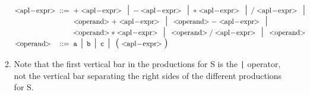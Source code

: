 \documentclass[11pt]{article}
\begin{document}
\begin{enumerate}
\begin{enumerate}
                  \(
                    \renewcommand{\arraystretch}{1.25}
                    \begin{array}[t]{@{}l@{\hspace{2mm}}l@{\hspace{2mm}}l}
                      \aplexpr
                        & ::=
                        & + \aplexpr \midspc - \aplexpr \midspc
                          * \aplexpr \midspc / \aplexpr \midspc
                          \\
                        & %
                        & \aploperand + \aplexpr \midspc
                          \aploperand - \aplexpr \midspc
                          \\
                        & %
                        & %
                          \aploperand * \aplexpr \midspc
                          \aploperand / \aplexpr \midspc \aploperand
                          \\
                      \aploperand
                        & ::=
                        & \mathtt{a} \midspc \mathtt{b} \midspc
                          \mathtt{c} \midspc \: \lpar \aplexpr \rpar
                          \\
                    \end{array}
                  \)

            \item Note that the first vertical bar in the productions for S
                  is the \texttt{|} operator, not the vertical bar
                  separating the right sides of the different productions
                  for S.

                  \medskip

                  \begin{grammar}[1.35]

                      \\

                      \\

                      \\

                      \\


\end{grammar}
\end{enumerate}
\end{enumerate}
\end{document}
